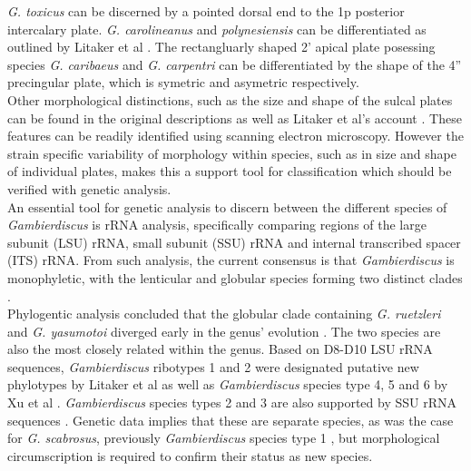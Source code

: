 \documentclass[12pt]{article}
\begin{document}
\emph{G. toxicus} can be discerned by a pointed dorsal end to the 1p posterior intercalary plate. \emph{G. carolineanus} and \emph{polynesiensis} can be differentiated as outlined by Litaker et al \cite{litaker2009taxonomy}. The rectangluarly shaped 2' apical plate posessing species \emph{G. caribaeus} and \emph{G. carpentri} can be differentiated by the shape of the 4'' precingular plate, which is symetric and asymetric respectively. \\
Other morphological distinctions, such as the size and shape of the sulcal plates can be found in the original descriptions as well as Litaker et al's account \cite{litaker2009taxonomy,fraga2011gambierdiscus,faust1995observation,holmes1998gambierdiscus,chinain1999morphology}. %
These features can be readily identified using scanning electron microscopy. However the strain specific variability of morphology within species, such as in size and shape of individual plates, makes this a support tool for classification which should be verified with genetic analysis. \\

An essential tool for genetic analysis to discern between the different species of \emph{Gambierdiscus} is rRNA analysis, specifically comparing regions of the large subunit (LSU) rRNA, small subunit (SSU) rRNA and internal transcribed spacer (ITS) rRNA. From such analysis, the current consensus is that \emph{Gambierdiscus} is monophyletic, with the lenticular and globular species forming two distinct clades \cite{chinain1999morphology,litaker2009taxonomy,fraga2011gambierdiscus,richlen2008phylogeography,kuno2010genetic,litaker2010global,nishimura2013genetic}. \\
Phylogentic analysis concluded that the globular clade containing \emph{G. ruetzleri} and \emph{G. yasumotoi} diverged early in the genus' evolution \cite{litaker2009taxonomy,nishimura2013genetic}. The two species are also the most closely related within the genus. 
Based on D8-D10 LSU rRNA sequences, \emph{Gambierdiscus} ribotypes 1 and 2 were designated putative new phylotypes by Litaker et al as well as \emph{Gambierdiscus} species type 4, 5 and 6 by Xu et al \cite{litaker2010global,xu2014distribution}. \emph{Gambierdiscus} species types 2 and 3 are also supported by SSU rRNA sequences \cite{nishimura2013genetic,kuno2010genetic}. Genetic data implies that these are separate species, as was the case for \emph{G. scabrosus}, previously \emph{Gambierdiscus} species type 1 \cite{nishimura2013genetic,nishimura2014morphology}, but morphological circumscription is required to confirm their status as new species. \\
\end{document}
